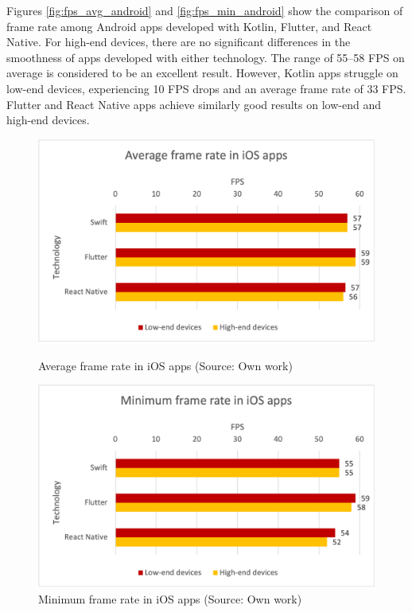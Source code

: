 Figures \ref{fig:fps_avg_android} and \ref{fig:fps_min_android} show the comparison of frame rate among Android apps developed with Kotlin, Flutter, and React Native. For high-end devices, there are no significant differences in the smoothness of apps developed with either technology. The range of 55--58 FPS on average is considered to be an excellent result. However, Kotlin apps struggle on low-end devices, experiencing 10 FPS drops and an average frame rate of 33 FPS. Flutter and React Native apps achieve similarly good results on low-end and high-end devices.

\begin{figure}[H]
    \begin{minipage}{.48\textwidth}
        \includegraphics[width=\textwidth]{img/fps_average_ios}
        \caption{Average frame rate in iOS apps (Source: Own work)}
        \label{fig:fps_avg_ios}
    \end{minipage}
    \hfill
    \begin{minipage}{.48\textwidth}
        \includegraphics[width=\textwidth]{img/fps_min_ios}
        \caption{Minimum frame rate in iOS apps (Source: Own work)}
        \label{fig:fps_min_ios}
    \end{minipage}
\end{figure}

